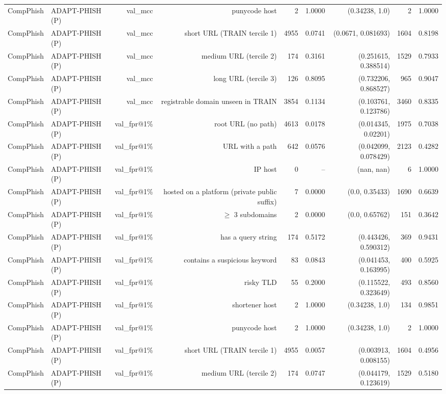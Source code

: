 \begin{table}[t]
\begin{tabular}{llrrrrrrr}
CompPhish & ADAPT-PHISH (P) & val\_mcc & punycode host & 2 & 1.0000 & (0.34238, 1.0) & 2 & 1.0000 \\
CompPhish & ADAPT-PHISH (P) & val\_mcc & short URL (TRAIN tercile 1) & 4955 & 0.0741 & (0.0671, 0.081693) & 1604 & 0.8198 \\
CompPhish & ADAPT-PHISH (P) & val\_mcc & medium URL (tercile 2) & 174 & 0.3161 & (0.251615, 0.388514) & 1529 & 0.7933 \\
CompPhish & ADAPT-PHISH (P) & val\_mcc & long URL (tercile 3) & 126 & 0.8095 & (0.732206, 0.868527) & 965 & 0.9047 \\
CompPhish & ADAPT-PHISH (P) & val\_mcc & registrable domain unseen in TRAIN & 3854 & 0.1134 & (0.103761, 0.123786) & 3460 & 0.8335 \\
CompPhish & ADAPT-PHISH (P) & val\_fpr@1\% & root URL (no path) & 4613 & 0.0178 & (0.014345, 0.02201) & 1975 & 0.7038 \\
CompPhish & ADAPT-PHISH (P) & val\_fpr@1\% & URL with a path & 642 & 0.0576 & (0.042099, 0.078429) & 2123 & 0.4282 \\
CompPhish & ADAPT-PHISH (P) & val\_fpr@1\% & IP host & 0 & -- & (nan, nan) & 6 & 1.0000 \\
CompPhish & ADAPT-PHISH (P) & val\_fpr@1\% & hosted on a platform (private public suffix) & 7 & 0.0000 & (0.0, 0.35433) & 1690 & 0.6639 \\
CompPhish & ADAPT-PHISH (P) & val\_fpr@1\% & $\geq$ 3 subdomains & 2 & 0.0000 & (0.0, 0.65762) & 151 & 0.3642 \\
CompPhish & ADAPT-PHISH (P) & val\_fpr@1\% & has a query string & 174 & 0.5172 & (0.443426, 0.590312) & 369 & 0.9431 \\
CompPhish & ADAPT-PHISH (P) & val\_fpr@1\% & contains a suspicious keyword & 83 & 0.0843 & (0.041453, 0.163995) & 400 & 0.5925 \\
CompPhish & ADAPT-PHISH (P) & val\_fpr@1\% & risky TLD & 55 & 0.2000 & (0.115522, 0.323649) & 493 & 0.8560 \\
CompPhish & ADAPT-PHISH (P) & val\_fpr@1\% & shortener host & 2 & 1.0000 & (0.34238, 1.0) & 134 & 0.9851 \\
CompPhish & ADAPT-PHISH (P) & val\_fpr@1\% & punycode host & 2 & 1.0000 & (0.34238, 1.0) & 2 & 1.0000 \\
CompPhish & ADAPT-PHISH (P) & val\_fpr@1\% & short URL (TRAIN tercile 1) & 4955 & 0.0057 & (0.003913, 0.008155) & 1604 & 0.4956 \\
CompPhish & ADAPT-PHISH (P) & val\_fpr@1\% & medium URL (tercile 2) & 174 & 0.0747 & (0.044179, 0.123619) & 1529 & 0.5180 \\

\end{tabular}
\end{table}
